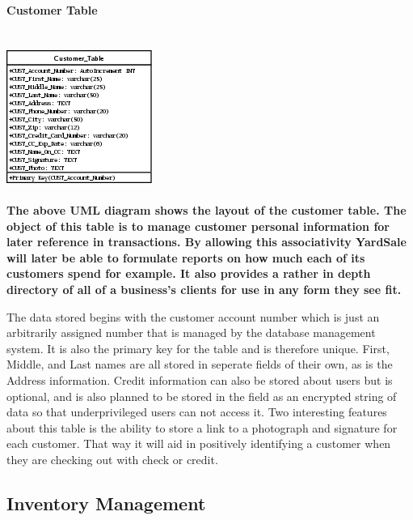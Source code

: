 \documentclass{report}
\begin{document}
	\bf{Customer Table}\\
	\\
	\\
	\includegraphics{Tables/CustomerTable.png}\\
	\\
	The above UML diagram shows the layout of the customer table. The object of this
	table is to manage customer personal information for later reference in
	transactions. By allowing this associativity YardSale will later be able to
	formulate reports on how much each of its customers spend for example. It also
	provides a rather in depth directory of all of a business's clients for use
	in any form they see fit.

	The data stored begins with the customer account number which is just an
	arbitrarily assigned number that is managed by the database management
	system. It is also the primary key for the table and is therefore unique.
	First, Middle, and Last names are all stored in seperate fields of their own,
	as is the Address information. Credit information can also be stored about users
	but is optional, and is also planned to be stored in the field as an encrypted
	string of data so that underprivileged users can not access it. Two interesting
	features about this table is the ability to store a link to a photograph and
	signature for each customer. That way it will aid in positively identifying a
	customer when they are checking out with check or credit.


	\newpage

	\subsection{Inventory Management}
\end{document}
